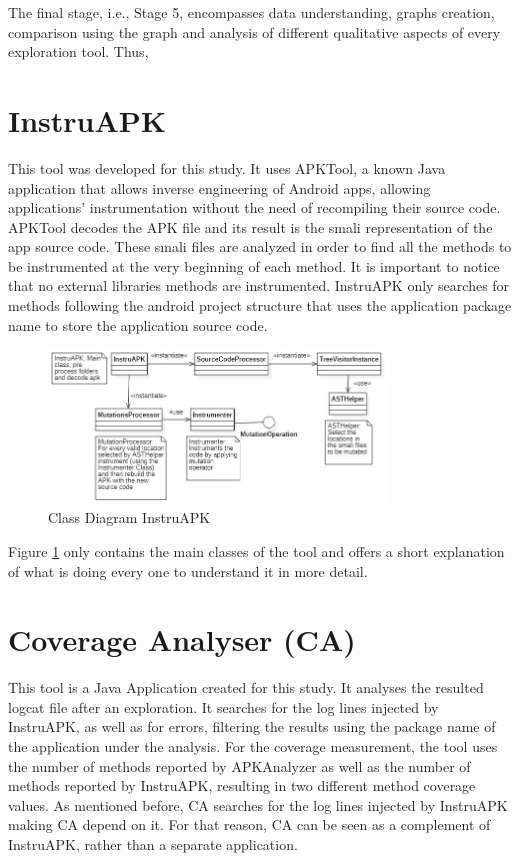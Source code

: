 The final stage, i.e.,  Stage 5,  encompasses data understanding, graphs creation, comparison using the graph and analysis of different qualitative aspects of every exploration tool. Thus, 



\section{InstruAPK}\label{sec:instruAPK}

This tool was developed for this study. It uses APKTool, a known Java application that allows inverse engineering of Android apps, allowing applications' instrumentation without the need of recompiling their source code. APKTool decodes the APK file and its result is the smali representation of the app source code. These smali files are analyzed in order to find all the methods to be instrumented at the very beginning of each method. It is important to notice that no external libraries methods are instrumented. InstruAPK only searches for methods following the android project structure that uses the application package name to store the application source code.

\begin{figure}[h]
\centering
\includegraphics[width=0.8\textwidth]{../Figures/ClassDiagramInstruAPK.jpg}
\caption{Class Diagram InstruAPK}\label{fig:instruAPK}
\end{figure}

Figure \ref{fig:instruAPK} only contains the main classes of the tool and offers a short explanation of what is doing every one to understand it in more detail.

\section{Coverage Analyser (CA)}\label{sec:ca}

This tool is a Java Application created for this study. It analyses the resulted logcat file after an exploration. It searches for the log lines injected by InstruAPK, as well as for errors, filtering the results using the package name of the application under the analysis. For the coverage measurement, the tool uses the number of methods reported by APKAnalyzer as well as the number of methods reported by InstruAPK, resulting in two different method coverage values. As mentioned before, CA searches for the log lines injected by InstruAPK making CA depend on it. For that reason, CA can be seen as a complement of InstruAPK, rather than a separate application.

